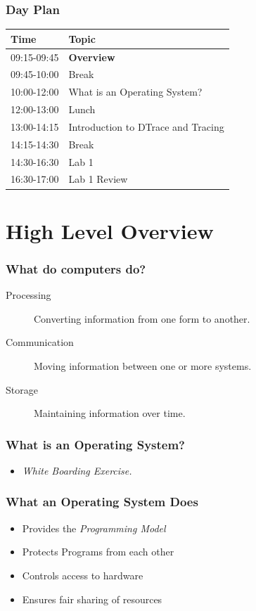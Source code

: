 \documentclass[pdftex]{beamer} %
\begin{document}
\begin{frame}
  \frametitle{Day Plan}
  \begin{tabular*}{1.0\linewidth}{l|l}
    Time & Topic \\
    \hline
    09:15-09:45 & \textbf{Overview} \\
    09:45-10:00 & Break \\
    10:00-12:00 & What is an Operating System? \\
    12:00-13:00 & Lunch \\
    13:00-14:15 & Introduction to DTrace and Tracing \\
    14:15-14:30 & Break \\
    14:30-16:30 & Lab 1 \\
    16:30-17:00 & Lab 1 Review
  \end{tabular*}
\end{frame}

\section{High Level Overview}
\begin{frame}
  \frametitle{What do computers do?}
  \begin{description}
  \item[Processing] Converting information from one form to another.
  \item[Communication] Moving information between one or more systems.
  \item[Storage] Maintaining information over time.
  \end{description}
\end{frame}

\begin{frame}
  \frametitle{What is an Operating System?}
  \begin{center}
    \begin{itemize}
    \item \emph{White Boarding Exercise.}
    \end{itemize}
  \end{center}
\end{frame}

\begin{frame}
  \frametitle{What an Operating System Does}
  \begin{itemize}
  \item Provides the \emph{Programming Model}

\pause

  \item Protects Programs from each other

\pause

  \item Controls access to hardware

\pause

  \item Ensures fair sharing of resources
  \end{itemize}
\end{frame}
\end{document}
